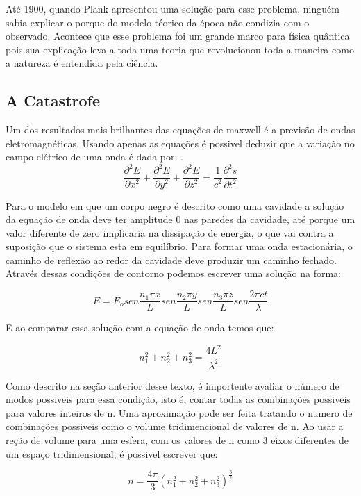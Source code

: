 \documentclass[11pt]{article}
\begin{document}
Até 1900, quando Plank apresentou uma solução para esse problema,
ninguém sabia explicar o porque do modelo téorico da época não condizia
com o observado. Acontece que esse problema foi um grande marco para
física quântica pois sua explicação leva a toda uma teoria que
revolucionou toda a maneira como a natureza é entendida pela ciência.

    \hypertarget{a-catastrofe}{%
\subsection{A Catastrofe}\label{a-catastrofe}}

Um dos resultados mais brilhantes das equações de maxwell é a previsão
de ondas eletromagnéticas. Usando apenas as equações é possivel deduzir
que a variação no campo elétrico de uma onda é dada por: . \[
\frac{\partial^2 E}{\partial x^2}+\frac{\partial^2 E}{\partial y^2}+\frac{\partial^2 E}{\partial z^2} =\frac{1}{c^2} \frac{\partial^2 s}{\partial t^2}
\]

Para o modelo em que um corpo negro é descrito como uma cavidade a
solução da equação de onda deve ter amplitude 0 nas paredes da cavidade,
até porque um valor diferente de zero implicaria na dissipação de
energia, o que vai contra a suposição que o sistema esta em equilíbrio.
Para formar uma onda estacionária, o caminho de reflexão ao redor da
cavidade deve produzir um caminho fechado. Através dessas condições de
contorno podemos escrever uma solução na forma:

\[
E=E_o sen \frac{n_1 \pi x}{L}  sen \frac{n_2 \pi y}{L}  sen \frac{n_3 \pi z}{L}  sen \frac{2 \pi c t}{\lambda} 
\]

E ao comparar essa solução com a equação de onda temos que:

\[
\begin{equation}
n_1^2+ n_2^2+ n_3^2=\frac{4L^2}{\lambda^2}
\label{n123} \tag{1}
\end{equation}
\]

Como descrito na seção anterior desse texto, é importente avaliar o
número de modos possiveis para essa condição, isto é, contar todas as
combinações possiveis para valores inteiros de n. Uma aproximação pode
ser feita tratando o numero de combinações possiveis como o volume
tridimencional de valores de n. Ao usar a reção de volume para uma
esfera, com os valores de n como 3 eixos diferentes de um espaço
tridimensional, é possivel escrever que:

\[
n=\frac{4 \pi}{3} (n_1^2+n_2^2+n_3^2)^{\frac{3}{2}}
\]
\end{document}

